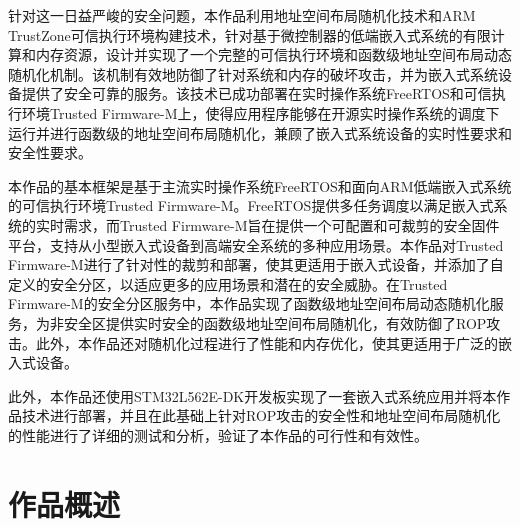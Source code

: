 \documentclass[UTF8,12pt,a4paper,twoside]{ctexart}
\numberwithin{figure}{section}
\begin{document}
\par 针对这一日益严峻的安全问题，本作品利用地址空间布局随机化技术和ARM TrustZone可信执行环境构建技术，针对基于微控制器的低端嵌入式系统的有限计算和内存资源，设计并实现了一个完整的可信执行环境和函数级地址空间布局动态随机化机制。该机制有效地防御了针对系统和内存的破坏攻击，并为嵌入式系统设备提供了安全可靠的服务。该技术已成功部署在实时操作系统FreeRTOS和可信执行环境Trusted Firmware-M上，使得应用程序能够在开源实时操作系统的调度下运行并进行函数级的地址空间布局随机化，兼顾了嵌入式系统设备的实时性要求和安全性要求。

\par 本作品的基本框架是基于主流实时操作系统FreeRTOS和面向ARM低端嵌入式系统的可信执行环境Trusted Firmware-M。FreeRTOS提供多任务调度以满足嵌入式系统的实时需求，而Trusted Firmware-M旨在提供一个可配置和可裁剪的安全固件平台，支持从小型嵌入式设备到高端安全系统的多种应用场景。本作品对Trusted Firmware-M进行了针对性的裁剪和部署，使其更适用于嵌入式设备，并添加了自定义的安全分区，以适应更多的应用场景和潜在的安全威胁。在Trusted Firmware-M的安全分区服务中，本作品实现了函数级地址空间布局动态随机化服务，为非安全区提供实时安全的函数级地址空间布局随机化，有效防御了ROP攻击。此外，本作品还对随机化过程进行了性能和内存优化，使其更适用于广泛的嵌入式设备。

\par 此外，本作品还使用STM32L562E-DK开发板实现了一套嵌入式系统应用并将本作品技术进行部署，并且在此基础上针对ROP攻击的安全性和地址空间布局随机化的性能进行了详细的测试和分析，验证了本作品的可行性和有效性。
\clearpage
\pagestyle{articleStyle}
\section{作品概述}
\end{document}
